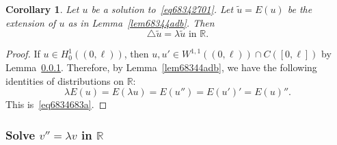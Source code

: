 \documentclass[a4paper,9pt]{amsart}
\newcommand{\R}{\mathbb{R}}	%
\newcommand{\laplacian}{\triangle}
\theoremstyle{plain}
\newtheorem{corollary}[proposition]{Corollary}
\theoremstyle{definition}
\theoremstyle{remark}
\begin{document}
\begin{corollary}\label{cor6834905d}
	Let $u$ be a solution to~\eqref{eq68342701}.
	Let $\tilde u = E(u)$ be the extension of $u$ as in Lemma~\ref{lem68344adb}.
	Then
	\begin{equation}\label{eq6834683a}
		\laplacian \tilde u = \lambda \tilde u \text{ in }\R .
	\end{equation}
\end{corollary}
\begin{proof}
	If $u\in H^1_0((0,\ell))$, then $u,u'\in W^{1,1}((0,\ell))\cap C([0,\ell])$ by Lemma~\ref{}.
	Therefore, by Lemma~\ref{lem68344adb}, we have the following identities of distributions on $\R$:
	\begin{equation}
		\lambda E(u) 
		= E(\lambda u)
		= E(u'')
		=  E(u')' = E(u)'' .
	\end{equation}
	This is~\eqref{eq6834683a}.
\end{proof}

\subsubsection{Solve $v''=\lambda v$ in $\R$}
\end{document}
